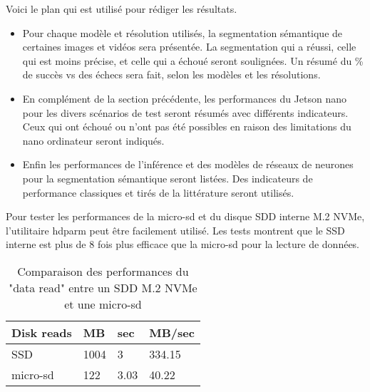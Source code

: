 ﻿{
   \color{red}
   \par Voici le plan qui est utilisé pour rédiger les résultats.
   \begin{itemize}
      \item \label{resultat1}Pour chaque modèle et résolution utilisés, la segmentation sémantique de certaines images et vidéos sera présentée. La segmentation qui a réussi, celle qui est moins précise, et celle qui a échoué seront soulignées. Un résumé du \% de succès vs des échecs sera fait, selon les modèles et les résolutions. 
      \item En complément de la section précédente, les performances du Jetson nano pour les divers scénarios de test seront résumés avec différents indicateurs. Ceux qui ont échoué ou n'ont pas été possibles en raison des limitations du nano ordinateur seront indiqués. 
      \item Enfin les performances de l'inférence et des modèles de réseaux de neurones pour la segmentation sémantique seront listées. Des indicateurs de performance classiques et tirés de la littérature seront utilisés.
   \end{itemize}
}
\par Pour tester les performances de la micro-sd et du disque SDD interne M.2 NVMe, l'utilitaire hdparm peut être facilement utilisé. Les tests montrent que le SSD interne est plus de 8 fois plus efficace que la micro-sd pour la lecture de données. 
{
   \centering
   \vspace{0.3em} %
   \renewcommand*{\arraystretch}{1.4}
   \begin{longtable}[t]{@{}|p{5em}|p{2em}|p{2em}|p{3em}|@{}} %
      \caption{Comparaison des performances du "data read" entre un SDD M.2 NVMe et une micro-sd}\label{tab:Timing O_DIRECT disk reads}\\
      \hline
      \textbf{Disk reads} & \textbf{MB} & \textbf{sec} & \textbf{MB/sec}\\
      \hline
         SSD & 1004 & 3 & 334.15\\
      \hline
      micro-sd & 122 & 3.03 & 40.22\\
      \hline
   \end{longtable}
}